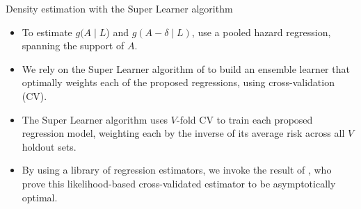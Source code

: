 \documentclass{beamer}
\begin{document}
\begin{frame}[c]{Density estimation with the Super Learner algorithm}

\begin{center}
\begin{itemize}
  \itemsep10pt
  \item To estimate $g(A \mid L$) and $g(A - \delta \mid L)$, use a pooled
    hazard regression, spanning the support of $A$.
  \item We rely on the Super Learner algorithm of \cite{vdl2007super} to build
    an ensemble learner that optimally weights each of the proposed regressions,
    using cross-validation (CV).
  \item The Super Learner algorithm uses $V$-fold CV to train each proposed
    regression model, weighting each by the inverse of its average risk across
    all $V$ holdout sets.
  \item By using a library of regression estimators, we invoke the result of
    \cite{vdl2004asymptotic}, who prove this likelihood-based cross-validated
    estimator to be asymptotically optimal.
\end{itemize}
\end{center}


\end{frame}


\setbeamercovered{}
\beamerdefaultoverlayspecification{}

\begin{frame}[c,allowframebreaks]{}

\small

\nocite{*}


\end{frame}

\end{document}
